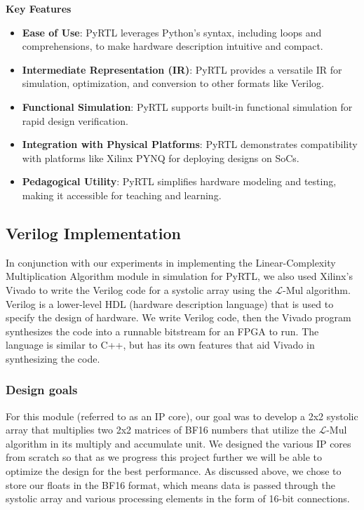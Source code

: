 \documentclass[12pt,letterpaper]{article}
\newcommand{\lmul}{$\mathcal{L}$-Mul\xspace}
\begin{document}
\textbf{Key Features}
\begin{itemize}
    \item \textbf{Ease of Use}: PyRTL leverages Python's syntax, including loops and comprehensions, to make hardware description intuitive and compact.
    \item \textbf{Intermediate Representation (IR)}: PyRTL provides a versatile IR for simulation, optimization, and conversion to other formats like Verilog.
    \item \textbf{Functional Simulation}: PyRTL supports built-in functional simulation for rapid design verification.
    \item \textbf{Integration with Physical Platforms}: PyRTL demonstrates compatibility with platforms like Xilinx PYNQ for deploying designs on SoCs.
    \item \textbf{Pedagogical Utility}: PyRTL simplifies hardware modeling and testing, making it accessible for teaching and learning.
\end{itemize}


\subsection{Verilog Implementation}
In conjunction with our experiments in implementing the Linear-Complexity Multiplication Algorithm module in simulation for PyRTL, we also used Xilinx’s Vivado to write the Verilog code for a systolic array using the \lmul algorithm.  Verilog is a lower-level HDL (hardware description language) that is used to specify the design of hardware.  We write Verilog code, then the Vivado program synthesizes the code into a runnable bitstream for an FPGA to run.  The language is similar to C++, but has its own features that aid Vivado in synthesizing the code. 

\subsubsection*{Design goals}
For this module (referred to as an IP core), our goal was to develop a 2x2 systolic array that multiplies two 2x2 matrices of BF16 numbers that utilize the \lmul algorithm in its multiply and accumulate unit. We designed the various IP cores from scratch so that as we progress this project further we will be able to optimize the design for the best performance.  As discussed above, we chose to store our floats in the BF16 format, which means data is passed through the systolic array and various processing elements in the form of 16-bit connections.
\end{document}
